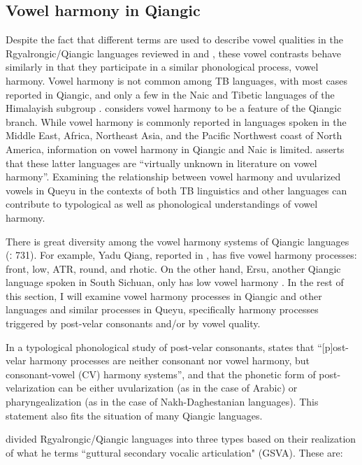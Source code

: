 \documentclass[output=paper]{langscibook}
\begin{document}
\subsection{Vowel harmony in Qiangic}\label{sec:guan:3.4}

Despite the fact that different terms are used to describe vowel qualities in the Rgyalrongic/Qiangic languages reviewed in  and , these vowel contrasts behave similarly in that they participate in a similar phonological process, vowel harmony. Vowel harmony is not common among TB languages, with most cases reported in Qiangic, and only a few in the Naic and Tibetic languages of the Himalayish subgroup \citep[729]{Chirkova2024}. \citet[10]{Sun2016} considers vowel harmony to be a feature of the Qiangic branch. While vowel harmony is commonly reported in languages spoken in the Middle East, Africa, Northeast Asia, and the Pacific Northwest coast of North America, information on vowel harmony in Qiangic and Naic is limited. \citet[730]{Chirkova2024} asserts that these latter languages are “virtually unknown in literature on vowel harmony”. Examining the relationship between vowel harmony and uvularized vowels in Queyu in the contexts of both TB linguistics and other languages can contribute to typological as well as phonological understandings of vowel harmony.

There is great diversity among the vowel harmony systems of Qiangic languages (\citealt{Chirkova2024}ː 731). For example, Yadu Qiang, reported in \citet{EvansHuang2007}, has five vowel harmony processes: front, low, ATR, round, and rhotic. On the other hand, Ersu, another Qiangic language spoken in South Sichuan, only has low vowel harmony \citep{Chirkova&al_2015}. In the rest of this section, I will examine vowel harmony processes in Qiangic and other languages and similar processes in Queyu, specifically harmony processes triggered by post-velar consonants and/or by vowel quality.

In a typological phonological study of post-velar consonants, \citet[75]{Sylak-Glassman2014} states that “[p]ost-velar harmony processes are neither consonant nor vowel harmony, but consonant-vowel (CV) harmony systems”, and that the phonetic form of post-velarization can be either uvularization (as in the case of Arabic) or pharyngealization (as in the case of Nakh-Daghestanian languages). This statement also fits the situation of many Qiangic languages. 

\citet[193]{Gong2020} divided Rgyalrongic/Qiangic languages into three types based on their realization of what he terms “guttural secondary vocalic articulation" (GSVA). These are: 
\end{document}
